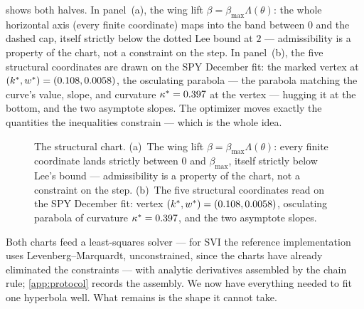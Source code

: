  shows both halves.  In panel~(a), the wing
lift $\beta=\beta_{\max}\Lambda(\theta)$: the whole horizontal axis
(every finite coordinate) maps into the band between $0$ and the
dashed cap, itself strictly below the dotted Lee bound at $2$ ---
admissibility is a property of the chart, not a constraint on the
step.  In panel~(b), the five structural coordinates are drawn on the
SPY December fit: the marked vertex at
$(k^*,w^*)=(0.108,0.0058)$, the osculating parabola
--- the parabola matching the curve's value, slope, and curvature
$\kappa^*=0.397$ at the vertex --- hugging it at the
bottom, and the two asymptote slopes.  The optimizer moves exactly the
quantities the inequalities constrain --- which is the whole idea.

\begin{figure}[htbp]
\centering
{}
\caption{The structural chart.  (a)~The wing lift
$\beta=\beta_{\max}\Lambda(\theta)$: every finite coordinate lands
strictly between $0$ and $\beta_{\max}$, itself strictly below Lee's
bound --- admissibility is a property of the chart, not a constraint
on the step.  (b)~The five structural coordinates read on the SPY
December fit: vertex $(k^*,w^*)=(0.108,0.0058)$,
osculating parabola of curvature $\kappa^*=0.397$, and
the two asymptote slopes.}
\label{fig:svistructural}
\end{figure}

Both charts feed a least-squares solver --- for SVI the reference
implementation uses Levenberg--Marquardt, unconstrained, since the
charts have already eliminated the constraints --- with analytic
derivatives assembled by the chain rule; \cref{app:protocol} records
the assembly.  We now have everything needed to fit
one hyperbola well.  What remains is the shape it cannot take.
